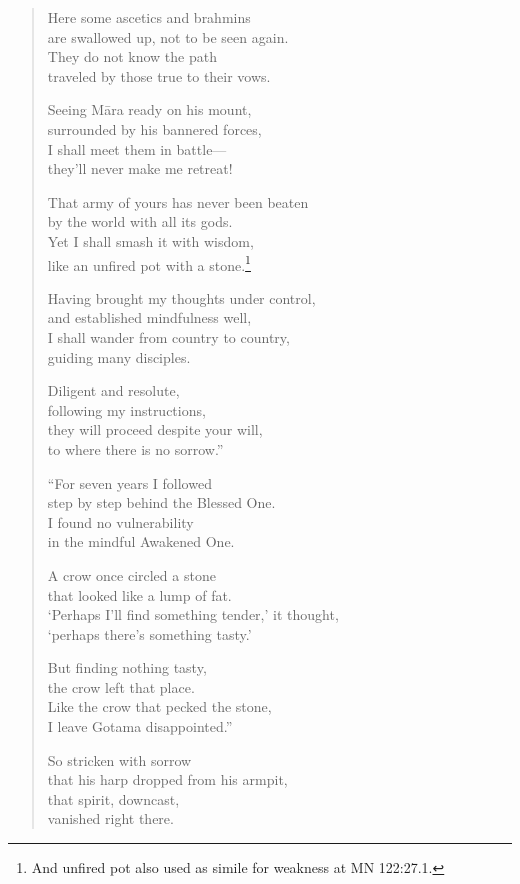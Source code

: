 \documentclass[12pt,openany]{book}%
\begin{document}
\begin{verse}
Here some ascetics and brahmins \\
are swallowed up, not to be seen again. \\
They do not know the path \\
traveled by those true to their vows. 

Seeing \textsanskrit{Māra} ready on his mount, \\
surrounded by his bannered forces, \\
I shall meet them in battle—\\
they’ll never make me retreat! 

That army of yours has never been beaten \\
by the world with all its gods. \\
Yet I shall smash it with wisdom, \\
like an unfired pot with a stone.\footnote{And unfired pot also used as simile for weakness at MN 122:27.1. } 

Having brought my thoughts under control, \\
and established mindfulness well, \\
I shall wander from country to country, \\
guiding many disciples. 

Diligent and resolute, \\
following my instructions, \\
they will proceed despite your will, \\
to where there is no sorrow.” 

“For seven years I followed \\
step by step behind the Blessed One. \\
I found no vulnerability \\
in the mindful Awakened One. 

A crow once circled a stone \\
that looked like a lump of fat. \\
‘Perhaps I’ll find something tender,’ it thought, \\
‘perhaps there’s something tasty.’ 

But finding nothing tasty, \\
the crow left that place. \\
Like the crow that pecked the stone, \\
I leave Gotama disappointed.” 

So stricken with sorrow \\
that his harp dropped from his armpit, \\
that spirit, downcast, \\
vanished right there. 

%
\end{verse}
\end{document}
